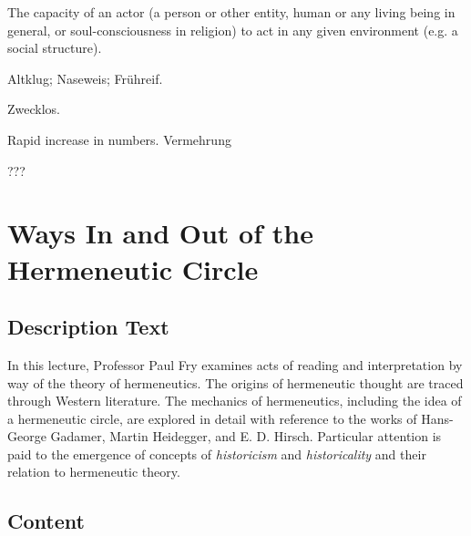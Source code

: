 \documentclass[]{scrartcl}
\begin{document}
\vspace{15pt}


\begin{description}[leftmargin=!,labelwidth=\widthof{\bfseries Proliferation}]
  \item[Agency] The capacity of an actor (a person or other entity, human or any living being in general, or soul-consciousness in religion) to act in any given environment (e.g. a social structure).
  \item[Precocious] Altklug; Naseweis; Fr\"uhreif.
  \item[Futile] Zwecklos.
  \item[Proliferation] Rapid increase in numbers. Vermehrung
  \item[Genealogy] ???
\end{description}

\section{Ways In and Out of the Hermeneutic Circle}


\subsection{Description Text}

\vspace{15pt}

In this lecture, Professor Paul Fry examines acts of reading and interpretation by way of the theory of hermeneutics. The origins of hermeneutic thought are traced through Western literature. The mechanics of hermeneutics, including the idea of a hermeneutic circle, are explored in detail with reference to the works of Hans-George Gadamer, Martin Heidegger, and E. D. Hirsch. Particular attention is paid to the emergence of concepts of \emph{historicism} and \emph{historicality} and their relation to hermeneutic theory.


\subsection{Content}
\end{document}
